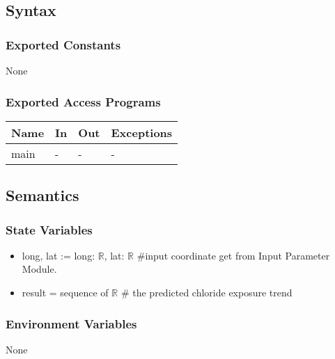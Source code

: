 \documentclass[12pt, titlepage]{article}
\begin{document}
\subsection{Syntax}

\subsubsection{Exported Constants}

None

\subsubsection{Exported Access Programs}

\begin{center}
\begin{tabular}{p{2cm} p{5cm} p{4cm} p{2cm}}
\hline
\textbf{Name} & \textbf{In} & \textbf{Out} & \textbf{Exceptions} \\
\hline
main & - & - & - \\
\hline
\end{tabular}
\end{center}

\subsection{Semantics}

\subsubsection{State Variables}
\begin{itemize}
\item long, lat := long: $\mathbb{R}$, lat: $\mathbb{R}$ \#input coordinate get from Input Parameter Module.
\item result = sequence of $\mathbb{R}$ \# the predicted chloride exposure trend

\end{itemize}

\subsubsection{Environment Variables}

None

\end{document}
